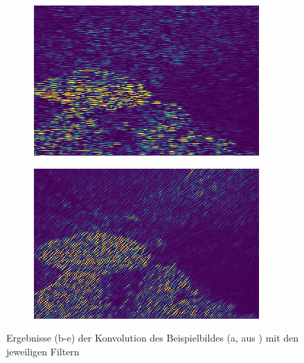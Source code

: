\begin{figure}[h!]
\begin{subfigure}[t]{0.32\textwidth}
		\subcaption{}
	\end{subfigure}
	\hfill
	\begin{subfigure}[t]{0.32\textwidth}
		\centering
		\includegraphics[width=\textwidth,keepaspectratio]{images/gen/GEN_tsugf_filterbank_101027_3.png}
		\subcaption{}
	\end{subfigure}
	\hfill
	\begin{subfigure}[t]{0.32\textwidth}
		\centering
		\includegraphics[width=\textwidth,keepaspectratio]{images/gen/GEN_tsugf_filterbank_101027_4.png}
		\subcaption{}
	\end{subfigure}
	\hfill
	\begin{subfigure}[t]{0.32\textwidth}
		\hfill
	\end{subfigure}
	\caption{Ergebnisse (b-e) der Konvolution des Beispielbildes (a, aus \cite{bsd500}) mit den jeweiligen Filtern}
	\label{fig:tsugf_101027_raw}
\end{figure}

